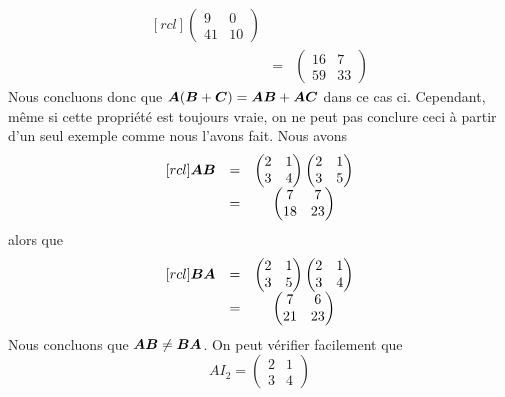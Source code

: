 \begin{exemple}
\[\begin{matrix}[rcl]
\begin{pmatrix}
    9 & 0 \\
    41 & 10
    \end{pmatrix}\\
    &=&
    \begin{pmatrix}
    16 & 7 \\
    59 & 33
    \end{pmatrix}
    \end{matrix}
    \]
    Nous concluons donc que $\boldsymbol{A}(\boldsymbol{B}+\boldsymbol{C}) = \boldsymbol{A}\boldsymbol{B} + \boldsymbol{A}\boldsymbol{C}$ dans ce cas ci. Cependant, même si cette
    propriété est toujours vraie, on ne peut pas conclure ceci à partir d'un seul exemple comme nous l'avons fait.
     Nous avons
        \[
        \begin{matrix}[rcl]
        \boldsymbol{A}\boldsymbol{B} &=&
            \begin{pmatrix}
		    2 & 1 \\
		    3 & 4
		    \end{pmatrix}
		    \begin{pmatrix}
		    2 & 1 \\
		    3 & 5
		    \end{pmatrix}\\
		    &=&
		    \begin{pmatrix}
		    7 & 7 \\
		    18 & 23
		    \end{pmatrix}
        \end{matrix}
        \]
    alors que
            \[
        \begin{matrix}[rcl]
        \boldsymbol{B}\boldsymbol{A} &=&
		    \begin{pmatrix}
		    2 & 1 \\
		    3 & 5
		    \end{pmatrix}
		    \begin{pmatrix}
		    2 & 1 \\
		    3 & 4
		    \end{pmatrix}\\
		    &=&
		    \begin{pmatrix}
		    7 & 6 \\
		    21 & 23
		    \end{pmatrix}
        \end{matrix}
        \]
    Nous concluons que $\boldsymbol{A}\boldsymbol{B} \neq \boldsymbol{B}\boldsymbol{A}$.
     On peut vérifier facilement que
    \[
    AI_2 = 		    
\begin{pmatrix}
		    2 & 1 \\
		    3 & 4
		    \end{pmatrix}
\]
\end{exemple}
